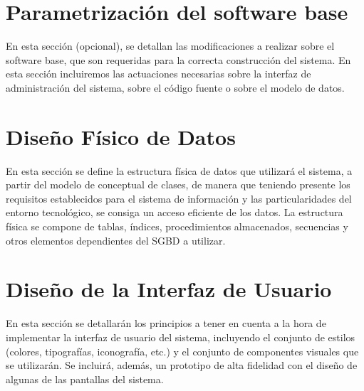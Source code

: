 \section{Parametrización del software base}
En esta sección (opcional), se detallan las modificaciones a realizar sobre el software base, que son requeridas para la correcta construcción del sistema. En esta sección incluiremos las  actuaciones necesarias sobre la interfaz de administración del sistema, sobre el código fuente o sobre el modelo de datos.

\section{Diseño Físico de Datos}
En esta sección se define la estructura física de datos que utilizará el sistema, a partir del modelo de conceptual de clases, de manera que teniendo presente los requisitos establecidos para el sistema de información y las particularidades del entorno tecnológico, se consiga un acceso eficiente de los datos. La estructura física se compone de tablas, índices, procedimientos almacenados, secuencias y otros elementos dependientes del SGBD a utilizar.

\section{Diseño de la Interfaz de Usuario} 
En esta sección se detallarán los principios a tener en cuenta a la hora de implementar la interfaz de usuario del sistema, incluyendo el conjunto de estilos (colores, tipografías, iconografía, etc.) y el conjunto de componentes visuales que se utilizarán. Se incluirá, además, un prototipo de alta fidelidad con el diseño de algunas de las pantallas del sistema.
